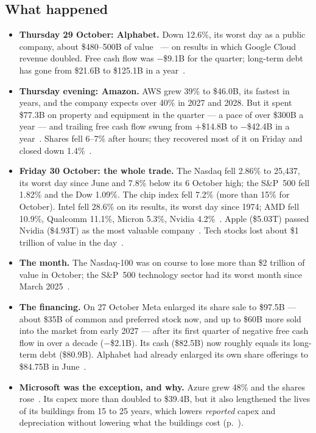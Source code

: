 \documentclass[11pt,letterpaper]{article}
\begin{document}
\subsection*{What happened}\label{news:what}
\begin{itemize}
\item \textbf{Thursday 29 October: Alphabet.} Down 12.6\%, its worst day as a public company, about \$480--500B of value~\cite{ref:cnbc_goog_1029,ref:yahoo_goog_1029} --- on results in which Google Cloud revenue doubled. Free cash flow was $-$\$9.1B for the quarter; long-term debt has gone from \$21.6B to \$125.1B in a year~\cite{ref:yahoo_nasdaq_1029}.
\item \textbf{Thursday evening: Amazon.} AWS grew 39\% to \$46.0B, its fastest in years, and the company expects over 40\% in 2027 and 2028. But it spent \$77.3B on property and equipment in the quarter --- a pace of over \$300B a year --- and trailing free cash flow swung from $+$\$14.8B to $-$\$42.4B in a year~\cite{ref:amzn_q3_2026,ref:fortune_amzn_1029}. Shares fell 6--7\% after hours; they recovered most of it on Friday and closed down 1.4\%~\cite{ref:reuters_1030}.
\item \textbf{Friday 30 October: the whole trade.} The Nasdaq fell 2.86\% to 25,437, its worst day since June and 7.8\% below its 6 October high; the S\&P~500 fell 1.82\% and the Dow 1.09\%. The chip index fell 7.2\% (more than 15\% for October). Intel fell 28.6\% on its results, its worst day since 1974; AMD fell 10.9\%, Qualcomm 11.1\%, Micron 5.3\%, Nvidia 4.2\%~\cite{ref:reuters_1030,ref:biggo_1030}. Apple (\$5.03T) passed Nvidia (\$4.93T) as the most valuable company~\cite{ref:biggo_1030}. Tech stocks lost about \$1 trillion of value in the day~\cite{ref:nbc_1030}.
\item \textbf{The month.} The Nasdaq-100 was on course to lose more than \$2 trillion of value in October; the S\&P~500 technology sector had its worst month since March 2025~\cite{ref:reuters_1030,ref:techinsider_oct}.
\item \textbf{The financing.} On 27 October Meta enlarged its share sale to \$97.5B --- about \$35B of common and preferred stock now, and up to \$60B more sold into the market from early 2027 --- after its first quarter of negative free cash flow in over a decade ($-$\$2.1B). Its cash (\$82.5B) now roughly equals its long-term debt (\$80.9B). Alphabet had already enlarged its own share offerings to \$84.75B in June~\cite{ref:aawsat_meta_1027}.
\item \textbf{Microsoft was the exception, and why.} Azure grew 48\% and the shares rose~\cite{ref:msft_q1fy27,ref:xtb_msft_1028}. Its capex more than doubled to \$39.4B, but it also lengthened the lives of its buildings from 15 to 25 years, which lowers \emph{reported} capex and depreciation without lowering what the buildings cost (p.~\pageref{ag:acct}).
\end{itemize}
\end{document}
